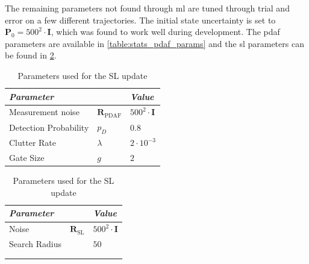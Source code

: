 The remaining parameters not found through \acrshort{ml} are tuned through trial and error on a few different trajectories.
The initial state uncertainty is set to $\boldsymbol{P}_0 = 500^2 \cdot \boldsymbol{I}$, which was found to work well during development. The \acrshort{pdaf} parameters are available in \cref{table:stats_pdaf_params} and the \acrshort{sl} parameters can be found in \cref{table:stats_sl_params}.

\begin{table}[h]
    \centering
    \begin{subtable}{0.49\textwidth}
        \begin{tabular}{|lll|}
            \textit{\textbf{Parameter}} &                                & \textit{\textbf{Value}}      \\ \hline
            Measurement noise           & $\boldsymbol{R}_{\text{PDAF}}$ & $500^2 \cdot \boldsymbol{I}$ \\
            Detection Probability       & $p_D$                          & $0.8$                        \\
            Clutter Rate                & $\lambda$                      & $2 \cdot 10^{-3}$            \\
            Gate Size                   & $g$                            & $2$
        \end{tabular}
        \caption{Parameters used for \acrshort{pdaf} update}
        \label{table:stats_pdaf_params}
    \end{subtable}
    \begin{subtable}{0.49 \textwidth}

        \centering
        \begin{tabular}{|lll|}
            \textit{\textbf{Parameter}} &                              & \textit{\textbf{Value}}      \\ \hline
            Noise                       & $\boldsymbol{R}_{\text{SL}}$ & $500^2 \cdot \boldsymbol{I}$ \\
            Search Radius               &                              & $50$                         \\
                                        &                              &                              \\
                                        &                              &
        \end{tabular}
        \caption{Parameters used for the SL update}
        \label{table:stats_sl_params}
    \end{subtable}
\end{table}



